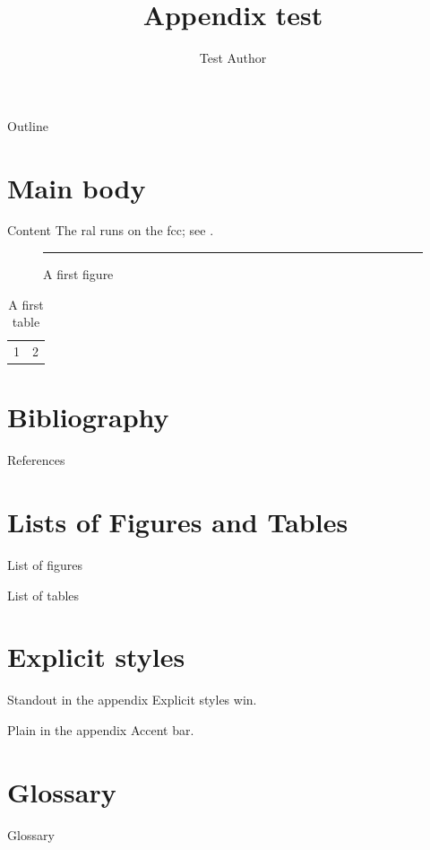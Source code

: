\documentclass[aspectratio=169,10pt]{beamer}
\title{Appendix test}
\author{Test Author}
\begin{document}
\maketitle

\begin{frame}[toc]{Outline}
	\tableofcontents
\end{frame}

\section{Main body}
\begin{frame}{Content}
	The \gls{ral} runs on the \gls{fcc}; see \cite{knuth1984,lamport1994}.
	\begin{figure}
		\rule{3cm}{1cm}
		\caption{A first figure}
	\end{figure}
	\begin{table}
		\begin{tabular}{cc}1 & 2\end{tabular}
		\caption{A first table}
	\end{table}
\end{frame}

\appendix
\section{Bibliography}
\begin{frame}[allowframebreaks]{References}
	\printbibliography[heading=none]
\end{frame}

\section{Lists of Figures and Tables}
\begin{frame}{List of figures}
	\listoffigures
\end{frame}
\begin{frame}{List of tables}
	\listoftables
\end{frame}

\section{Explicit styles}
\begin{frame}[standout]{Standout in the appendix}
	Explicit styles win.
\end{frame}
\begin{frame}[plain]{Plain in the appendix}
	Accent bar.
\end{frame}

\section{Glossary}
\begin{frame}[allowframebreaks]{Glossary}
	\printglossaries
\end{frame}
\end{document}
